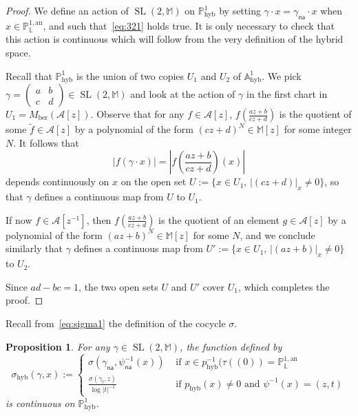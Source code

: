 \documentclass[11pt]{article}
\newtheorem{prop}[theo]{Proposition}
\theoremstyle{definition}
\numberwithin{equation}{section}
\numberwithin{figure}{section}
\numberwithin{table}{section}
\DeclareMathOperator{\hyb}{hyb}
\DeclareMathOperator{\SL}{SL}
\newcommand{\cA}{\mathcal{A}}
\newcommand{\mm}{\mathbb{M}}
\newcommand{\A}{{\mathbb A}}
\newcommand{\an}{\mathrm{an}}
\newcommand{\PP}{\mathbb{P}}
\newcommand{\Laurent}{\mathbb{L}}
\newcommand{\lrpar}[1]{\left(#1\right)}
\newcommand{\na}{\mathsf{na}}
\newcommand{\inv}{^{-1}}
\begin{document}
\begin{proof}
We define an action of $\SL(2,\mm)$ on $\PP^1_{\hyb}$ by setting $\gamma \cdot x = \gamma_{\na} \cdot x$ when $x\in \PP^{1,\an}_{\Laurent}$, and such that~\eqref{eq:321} holds true. It is only necessary to check that this action is continuous which will follow from the very definition of the hybrid space.

Recall that $\PP^1_{\hyb}$ is the union of two copies $U_1$ and $U_2$ of $\A^1_{\hyb}$. We pick $\gamma = \lrpar{
\begin{smallmatrix} a & b \\ c & d
\end{smallmatrix}} \in \SL(2,\mm)$
and look at the action of $\gamma$ in the first chart in $U_1= M_{\mathrm{ber}}(\cA[z])$. Observe that for any $f\in \cA[z]$, $f(\frac{az+b}{cz+d})$ is the quotient of some $\widetilde{f}\in \cA[z]$ by a polynomial of the form $(cz+d)^N\in \mm[z]$ for some integer $N$. It follows that
\[
|f(\gamma \cdot x)| = \left|f\left(\frac{az+b}{cz+d}\right) (x)\right|
\]
depends continuously on $x$ on the open set $U:= \{x\in U_1, \, |(cz+d)|_x\neq 0\}$, so that $\gamma$ defines a continuous map from $U$ to $U_1$.

If now $f\in \cA[z^{-1}]$, then $f(\frac{az+b}{cz+d})$ is the quotient of an element $g\in \cA[z]$ by a polynomial of the form $(az+b)^N\in \mm[z]$ for some $N$, and we conclude similarly that $\gamma$ defines a continuous map from $U':= \{x\in U_1, \, |(az+b)|_x\neq 0\}$ to $U_2$.

Since $ad-bc =1$, the two open sets $U$ and $U'$ cover $U_1$, which completes the proof.
\end{proof}

Recall from~\eqref{eq:sigma1} the definition of the cocycle $\sigma$.

\begin{prop}\label{prop:hybrid sigma}
For any $\gamma\in \SL(2,\mm)$, the function defined by
\[
\sigma_{\hyb}(\gamma,x) :=
\begin{cases}
\sigma(\gamma_\na,\psi_\na\inv(x)) & \text{ if } x \in p_{\hyb}^{-1}(\tau((0)) = \PP^{1,\an}_{\Laurent}
\\
\frac{\sigma(\gamma_t,z)}{\log\mathopen|t\mathclose|^{-1}}& \text{ if } p_{\hyb}(x) \neq 0 \text{ and } \psi^{-1}(x) = (z,t)
\end{cases}
\]
is continuous on $\PP^1_{\hyb}$.
\end{prop}
\end{document}

